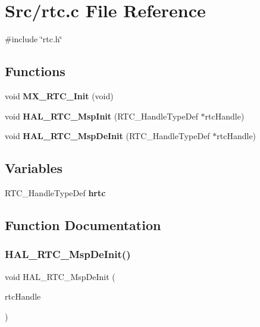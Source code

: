 \section{Src/rtc.c File Reference}
\label{rtc_8c}
{\ttfamily \#include \char`\"{}rtc.\+h\char`\"{}}\newline
\subsection*{Functions}
\begin{DoxyCompactItemize}
\item 
void \textbf{ M\+X\+\_\+\+R\+T\+C\+\_\+\+Init} (void)
\item 
void \textbf{ H\+A\+L\+\_\+\+R\+T\+C\+\_\+\+Msp\+Init} (R\+T\+C\+\_\+\+Handle\+Type\+Def $\ast$rtc\+Handle)
\item 
void \textbf{ H\+A\+L\+\_\+\+R\+T\+C\+\_\+\+Msp\+De\+Init} (R\+T\+C\+\_\+\+Handle\+Type\+Def $\ast$rtc\+Handle)
\end{DoxyCompactItemize}
\subsection*{Variables}
\begin{DoxyCompactItemize}
\item 
R\+T\+C\+\_\+\+Handle\+Type\+Def \textbf{ hrtc}
\end{DoxyCompactItemize}


\subsection{Function Documentation}
\mbox{\label{rtc_8c_a17b728569834d5a73fb8713b6a41806f}} 
\subsubsection{H\+A\+L\+\_\+\+R\+T\+C\+\_\+\+Msp\+De\+Init()}
{\footnotesize\ttfamily void H\+A\+L\+\_\+\+R\+T\+C\+\_\+\+Msp\+De\+Init (\begin{DoxyParamCaption}\item[{R\+T\+C\+\_\+\+Handle\+Type\+Def $\ast$}]{rtc\+Handle }\end{DoxyParamCaption})}

\mbox{\label{rtc_8c_a453bd7b485bdb49c54872947f546655c}} 

